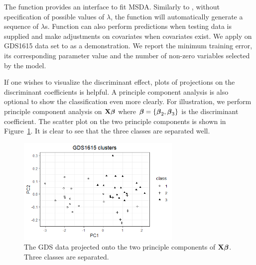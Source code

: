   
  
  The function  provides an interface to fit MSDA. Similarly to , without specification of possible values of $\lambda$, the function will automatically generate a sequence of $\lambda$s. Function  can also perform predictions when testing data is supplied and make adjustments on covariates when covariates exist.  We apply  on GDS1615 data set to as a demonstration. We report the minimum training error, its corresponding parameter value and the number of non-zero variables selected by the model.
  
  
  
  
  

If one wishes to visualize the discriminant effect, plots of projections on the discriminant coefficients is helpful. A principle component analysis is also optional to show the classification even more clearly.
For illustration, we perform principle component analysis on $\mathbf{X}\boldsymbol{\beta}$ where $\boldsymbol{\beta}=\{\boldsymbol{\beta}_2, \boldsymbol{\beta}_3\}$ is the discriminant coefficient. The scatter plot on the two principle components is shown in Figure~\ref{fig:msdagds}. It is clear to see that the three classes are separated well.

\begin{figure}[t]
 \centering
 \includegraphics[width=0.7\textwidth]{pic/msda_gds_plot.png}
 \caption{The GDS data projected onto the two principle components of $\mathbf{X}\boldsymbol{\beta}$. Three classes are separated.}
 \label{fig:msdagds}
\end{figure}


